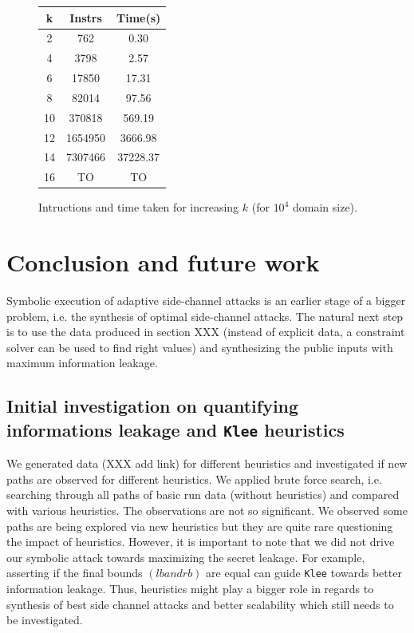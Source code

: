 \documentclass[11pt,a4paper,notitlepage]{article}
\begin{document}
\begin{figure}
\centering
\begin{tabular}{|c|c|c|}
\hline
\textbf{k}  & Instrs  & Time(s) \\ \hline \hline
2  &     762 &     0.30 \\
4  &    3798 &     2.57 \\
6  &   17850 &    17.31 \\
8  &   82014 &    97.56 \\
10 &  370818 &   569.19 \\
12 & 1654950 &  3666.98 \\
14 & 7307466 & 37228.37 \\
16 &  TO &  TO \\
\hline
\end{tabular}
\caption{Intructions and time taken for increasing $k$ (for $10^4$ domain size).}
\label{fig:scalability}
\end{figure}

\section{Conclusion and future work}
\label{sec:futurework}

Symbolic execution of adaptive side-channel attacks is an earlier stage of a bigger problem, i.e. the synthesis of optimal side-channel attacks.
The natural next step is to use the data produced in section XXX (instead of explicit data, a constraint solver can be used to find right values) and synthesizing the public inputs with maximum information leakage.

\subsection{Initial investigation on quantifying informations leakage and \texttt{Klee} heuristics}
\label{subsec:initialinvestigationleakage}

We generated data (XXX add link) for different heuristics and investigated if new paths are observed for different heuristics.
We applied brute force search, i.e. searching through all paths of basic run data (without heuristics) and compared with various heuristics.
The observations are not so significant. We observed some paths are being explored via new heuristics but they are quite rare questioning the impact of heuristics.
However, it is important to note that we did not drive our symbolic attack towards maximizing the secret leakage.
For example, asserting if the final bounds $(lb and rb)$ are equal can guide \texttt{Klee} towards better information leakage.
Thus, heuristics might play a bigger role in regards to synthesis of best side channel attacks and better scalability which still needs to be investigated.





\end{document}
